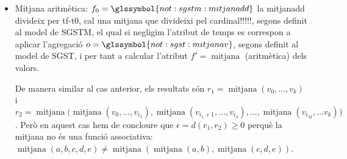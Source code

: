 \begin{example}
\begin{itemize}
    Si $S=\{m_0,\dotsc,m_k\}$ on $m_k=(t_k,v_k)$ aleshores
    $r_1=o(S)=\max(v_0,\dotsc, v_k)$. En canvi $S'=\{
    (\tau_0+\delta_0, \max(v_0,\dotsc,v_{i_1})),
    (\tau_0+2\delta_0,\max(v_{i_1+1},\dotsc,v_{i_2})), \dotsc,
    (\tau_0+M\delta_0,\max(v_{i_M}, \dotsc, v_k)) \}$ i aleshores
    $r_2=o(S')= \max\big( \max(v_0,\dotsc,v_{i_1}),
    \max(v_{i_1+1},\dotsc,v_{i_2}), \dotsc, \max(v_{i_M}, \dotsc v_k)
    \big)$.

    Podem concloure que en aquest cas $r_1=r_2$, i per tant
    $\epsilon=d(r_1,r_2)=0$ , perquè $\max(v_0,\dotsc, v_k) =
    \max\big( \max(v_0,\dotsc,v_{i_1}),
    \max(v_{i_1+1},\dotsc,v_{i_2}), \dotsc, \max(v_{i_M}, \dotsc v_k)
    \big)$ i $\max$ és una funció associativa: $\max(a,b,c,d,e) = \max(
    \max(a,b), \max(c,d,e))$.

    En aquest exemple hem negligit els temps resultants de
    l'agregació. És a dir, $r_1$ és correspon amb una o més d'una
    mesura $m_a\in S: V(m_a)=r_1$ i de la mateixa manera $m_b\in S':
    V(m_b)=r_2$ on hem conclòs que $V(m_a)=V(m_b)$. Això no obstant,
    en general els temps d'aquestes mesures no es correspondran,
    $T(m_a)\neq T(m_b)$ perquè $f_0=\glssymbol{not:sgstm:maxdd}$
    resumeix els atributs de temps segons l'interval de consolidació i
    al marge del resum de la informació en els valors.



\item   Mitjana aritmètica:
  $f_0=\glssymbol{not:sgstm:mitjanadd}$ la mitjanadd
  divideix per tf-t0, cal una mitjana que divideixi pel
  cardinal!!!!!, segons definit al model de
  \gls{SGSTM}, el qual si negligim l'atribut de temps es correspon a
  aplicar l'agregació $o=\glssymbol{not:sgst:mitjanav}$, segons
  definit al model de \gls{SGST}, i per tant a calcular l'atribut
  $f'=\operatorname{mitjana}$ (aritmètica) dels valors.

    De manera similar al cas anterior, els resultats són
    $r_1=\operatorname{mitjana}(v_0,\dotsc, v_k)$ i
    $r_2=\operatorname{mitjana}\big(
    \operatorname{mitjana}(v_0,\dotsc,v_{i_1}),
    \operatorname{mitjana}(v_{i_1+1},\dotsc,v_{i_2}), \dotsc,
    \operatorname{mitjana}(v_{i_M}, \dotsc v_k) \big)$.  Però en
    aquest cas hem de concloure que $\epsilon=d(r_1,r_2)\geq 0$ perquè
    la mitjana no és una funció associativa:
    $\operatorname{mitjana}(a,b,c,d,e) \neq \operatorname{mitjana}(
    \operatorname{mitjana}(a,b), \operatorname{mitjana}(c,d,e))$.
 



\end{itemize}
\end{example}
